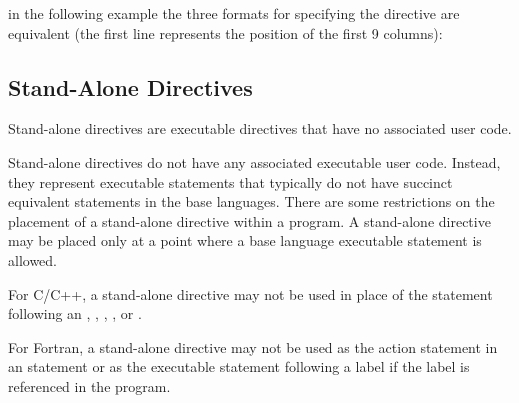 \begin{fortranspecific}
\begin{note}
in the following example the three formats for specifying the directive are
equivalent (the first line represents the position of the first 9 columns):

\end{note}
\bigskip
\end{fortranspecific}








\subsection{Stand-Alone Directives}
\label{subsec:Stand-Alone Directives}
\summary
Stand-alone directives are executable directives that have no associated user code.

\descr
Stand-alone directives do not have any associated executable user code. Instead, they
represent executable statements that typically do not have succinct equivalent statements
in the base languages. There are some restrictions on the placement of a stand-alone
directive within a program. A stand-alone directive may be placed only at a point where
a base language executable statement is allowed.

\restrictions
\begin{ccppspecific}
For C/C++, a stand-alone directive may not be used in place of the statement following
an , , , , or .
\end{ccppspecific}

\begin{fortranspecific}
For Fortran, a stand-alone directive may not be used as the action statement in an 
statement or as the executable statement following a label if the label is referenced in
the program.
\end{fortranspecific}










